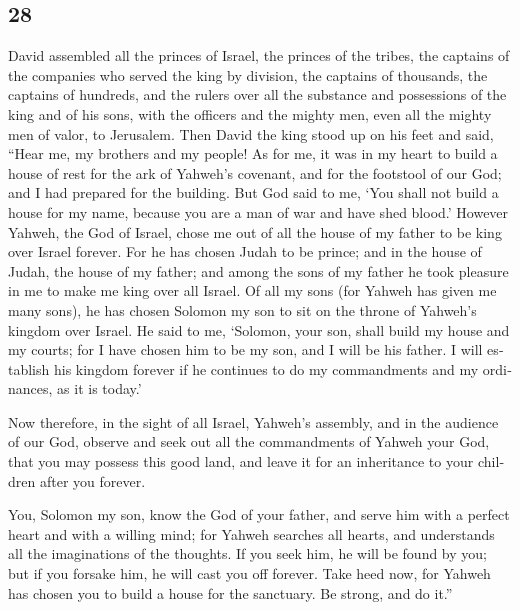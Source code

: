 \begin{paracol}{2}
\switchcolumn
\begin{otherlanguage}{english}

\hypertarget{section-55}{%
\section{28}\label{section-55}}

 David assembled all the princes of Israel, the princes of
the tribes, the captains of the companies who served the king by
division, the captains of thousands, the captains of hundreds, and the
rulers over all the substance and possessions of the king and of his
sons, with the officers and the mighty men, even all the mighty men of
valor, to Jerusalem.  Then David the king stood up on his
feet and said, ``Hear me, my brothers and my people! As for me, it was
in my heart to build a house of rest for the ark of Yahweh's covenant,
and for the footstool of our God; and I had prepared for the building.
 But God said to me, `You shall not build a house for my
name, because you are a man of war and have shed blood.' 
However Yahweh, the God of Israel, chose me out of all the house of my
father to be king over Israel forever. For he has chosen Judah to be
prince; and in the house of Judah, the house of my father; and among the
sons of my father he took pleasure in me to make me king over all
Israel.  Of all my sons (for Yahweh has given me many
sons), he has chosen Solomon my son to sit on the throne of Yahweh's
kingdom over Israel.  He said to me, `Solomon, your son,
shall build my house and my courts; for I have chosen him to be my son,
and I will be his father.  I will establish his kingdom
forever if he continues to do my commandments and my ordinances, as it
is today.'

 Now therefore, in the sight of all Israel, Yahweh's
assembly, and in the audience of our God, observe and seek out all the
commandments of Yahweh your God, that you may possess this good land,
and leave it for an inheritance to your children after you forever.

 You, Solomon my son, know the God of your father, and
serve him with a perfect heart and with a willing mind; for Yahweh
searches all hearts, and understands all the imaginations of the
thoughts. If you seek him, he will be found by you; but if you forsake
him, he will cast you off forever.  Take heed now, for
Yahweh has chosen you to build a house for the sanctuary. Be strong, and
do it.''


\end{otherlanguage}
\end{paracol}
